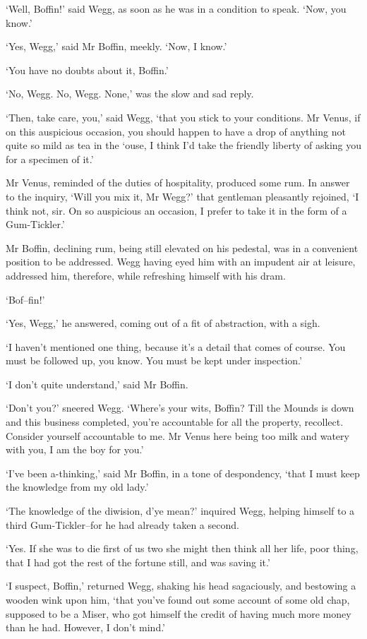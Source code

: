 ‘Well, Boffin!’ said Wegg, as soon as he was in a condition to speak.
‘Now, you know.’

‘Yes, Wegg,’ said Mr Boffin, meekly. ‘Now, I know.’

‘You have no doubts about it, Boffin.’

‘No, Wegg. No, Wegg. None,’ was the slow and sad reply.

‘Then, take care, you,’ said Wegg, ‘that you stick to your conditions.
Mr Venus, if on this auspicious occasion, you should happen to have a
drop of anything not quite so mild as tea in the ‘ouse, I think I’d take
the friendly liberty of asking you for a specimen of it.’

Mr Venus, reminded of the duties of hospitality, produced some rum.
In answer to the inquiry, ‘Will you mix it, Mr Wegg?’ that gentleman
pleasantly rejoined, ‘I think not, sir. On so auspicious an occasion, I
prefer to take it in the form of a Gum-Tickler.’

Mr Boffin, declining rum, being still elevated on his pedestal, was in
a convenient position to be addressed. Wegg having eyed him with an
impudent air at leisure, addressed him, therefore, while refreshing
himself with his dram.

‘Bof--fin!’

‘Yes, Wegg,’ he answered, coming out of a fit of abstraction, with a
sigh.

‘I haven’t mentioned one thing, because it’s a detail that comes of
course. You must be followed up, you know. You must be kept under
inspection.’

‘I don’t quite understand,’ said Mr Boffin.

‘Don’t you?’ sneered Wegg. ‘Where’s your wits, Boffin? Till the Mounds
is down and this business completed, you’re accountable for all the
property, recollect. Consider yourself accountable to me. Mr Venus here
being too milk and watery with you, I am the boy for you.’

‘I’ve been a-thinking,’ said Mr Boffin, in a tone of despondency, ‘that
I must keep the knowledge from my old lady.’

‘The knowledge of the diwision, d’ye mean?’ inquired Wegg, helping
himself to a third Gum-Tickler--for he had already taken a second.

‘Yes. If she was to die first of us two she might then think all her
life, poor thing, that I had got the rest of the fortune still, and was
saving it.’

‘I suspect, Boffin,’ returned Wegg, shaking his head sagaciously, and
bestowing a wooden wink upon him, ‘that you’ve found out some account
of some old chap, supposed to be a Miser, who got himself the credit of
having much more money than he had. However, I don’t mind.’

